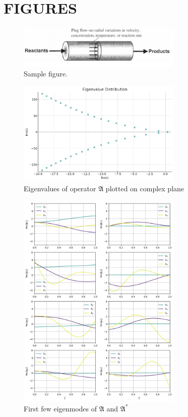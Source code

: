\newpage
\section*{FIGURES}

\begin{figure}[!htbp]
    \centering
    \includegraphics[width=0.7\textwidth]{Figures/sample.jpeg}
    \caption{Sample figure.}
    \label{fig:reactor_scheme}
\end{figure}

\begin{figure}[!htbp]
    \centering
    \includegraphics[width=0.7\textwidth]{Figures/eigval_dist_R_0.3.jpg}
    \caption{Eigenvalues of operator $\mathfrak{A}$ plotted on complex plane}
    \label{fig:eigval_dist}
\end{figure}

\begin{figure}[!htbp]
    \centering
    \includegraphics[width=0.7\textwidth]{Figures/eigfuns.png}
    \caption{First few eigenmodes of $\mathfrak{A}$ and $\mathfrak{A}^*$}
    \label{fig:eigfun}
\end{figure}

